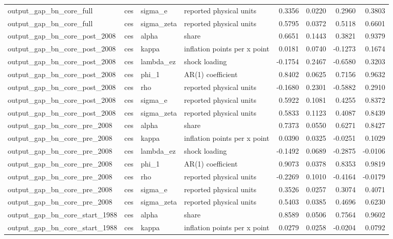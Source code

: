\begin{tabular}{llllrrrr}
output\_gap\_bn\_core\_full & ces & sigma\_e & reported physical units & 0.3356 & 0.0220 & 0.2960 & 0.3803 \\
output\_gap\_bn\_core\_full & ces & sigma\_zeta & reported physical units & 0.5795 & 0.0372 & 0.5118 & 0.6601 \\
output\_gap\_bn\_core\_post\_2008 & ces & alpha & share & 0.6651 & 0.1443 & 0.3821 & 0.9379 \\
output\_gap\_bn\_core\_post\_2008 & ces & kappa & inflation points per x point & 0.0181 & 0.0740 & -0.1273 & 0.1674 \\
output\_gap\_bn\_core\_post\_2008 & ces & lambda\_ez & shock loading & -0.1754 & 0.2467 & -0.6580 & 0.3203 \\
output\_gap\_bn\_core\_post\_2008 & ces & phi\_1 & AR(1) coefficient & 0.8402 & 0.0625 & 0.7156 & 0.9632 \\
output\_gap\_bn\_core\_post\_2008 & ces & rho & reported physical units & -0.1680 & 0.2301 & -0.5882 & 0.2910 \\
output\_gap\_bn\_core\_post\_2008 & ces & sigma\_e & reported physical units & 0.5922 & 0.1081 & 0.4255 & 0.8372 \\
output\_gap\_bn\_core\_post\_2008 & ces & sigma\_zeta & reported physical units & 0.5833 & 0.1123 & 0.4087 & 0.8439 \\
output\_gap\_bn\_core\_pre\_2008 & ces & alpha & share & 0.7373 & 0.0550 & 0.6271 & 0.8427 \\
output\_gap\_bn\_core\_pre\_2008 & ces & kappa & inflation points per x point & 0.0390 & 0.0325 & -0.0251 & 0.1029 \\
output\_gap\_bn\_core\_pre\_2008 & ces & lambda\_ez & shock loading & -0.1492 & 0.0689 & -0.2875 & -0.0106 \\
output\_gap\_bn\_core\_pre\_2008 & ces & phi\_1 & AR(1) coefficient & 0.9073 & 0.0378 & 0.8353 & 0.9819 \\
output\_gap\_bn\_core\_pre\_2008 & ces & rho & reported physical units & -0.2269 & 0.1010 & -0.4164 & -0.0179 \\
output\_gap\_bn\_core\_pre\_2008 & ces & sigma\_e & reported physical units & 0.3526 & 0.0257 & 0.3074 & 0.4071 \\
output\_gap\_bn\_core\_pre\_2008 & ces & sigma\_zeta & reported physical units & 0.5403 & 0.0385 & 0.4696 & 0.6230 \\
output\_gap\_bn\_core\_start\_1988 & ces & alpha & share & 0.8589 & 0.0506 & 0.7564 & 0.9602 \\
output\_gap\_bn\_core\_start\_1988 & ces & kappa & inflation points per x point & 0.0279 & 0.0258 & -0.0204 & 0.0792 \\

\end{tabular}
